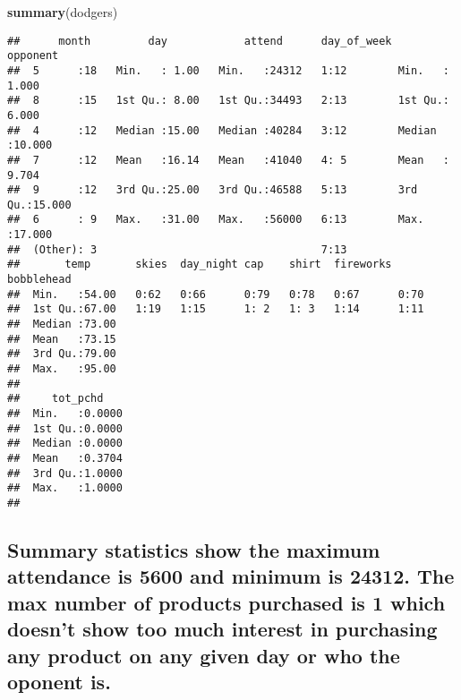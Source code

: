 \documentclass[
]{article}
\newenvironment{Shaded}{\begin{snugshade}}{\end{snugshade}}
\newcommand{\KeywordTok}[1]{\textcolor[rgb]{0.13,0.29,0.53}{\textbf{#1}}}
\newcommand{\NormalTok}[1]{#1}
\begin{document}
\begin{Shaded}
\begin{Highlighting}[]
\KeywordTok{summary}\NormalTok{(dodgers)}
\end{Highlighting}
\end{Shaded}

\begin{verbatim}
##      month         day            attend      day_of_week    opponent     
##  5      :18   Min.   : 1.00   Min.   :24312   1:12        Min.   : 1.000  
##  8      :15   1st Qu.: 8.00   1st Qu.:34493   2:13        1st Qu.: 6.000  
##  4      :12   Median :15.00   Median :40284   3:12        Median :10.000  
##  7      :12   Mean   :16.14   Mean   :41040   4: 5        Mean   : 9.704  
##  9      :12   3rd Qu.:25.00   3rd Qu.:46588   5:13        3rd Qu.:15.000  
##  6      : 9   Max.   :31.00   Max.   :56000   6:13        Max.   :17.000  
##  (Other): 3                                   7:13                        
##       temp       skies  day_night cap    shirt  fireworks bobblehead
##  Min.   :54.00   0:62   0:66      0:79   0:78   0:67      0:70      
##  1st Qu.:67.00   1:19   1:15      1: 2   1: 3   1:14      1:11      
##  Median :73.00                                                      
##  Mean   :73.15                                                      
##  3rd Qu.:79.00                                                      
##  Max.   :95.00                                                      
##                                                                     
##     tot_pchd     
##  Min.   :0.0000  
##  1st Qu.:0.0000  
##  Median :0.0000  
##  Mean   :0.3704  
##  3rd Qu.:1.0000  
##  Max.   :1.0000  
## 
\end{verbatim}

\hypertarget{summary-statistics-show-the-maximum-attendance-is-5600-and-minimum-is-24312.-the-max-number-of-products-purchased-is-1-which-doesnt-show-too-much-interest-in-purchasing-any-product-on-any-given-day-or-who-the-oponent-is.}{%
\subsection{Summary statistics show the maximum attendance is 5600 and
minimum is 24312. The max number of products purchased is 1 which
doesn't show too much interest in purchasing any product on any given
day or who the oponent
is.}\label{summary-statistics-show-the-maximum-attendance-is-5600-and-minimum-is-24312.-the-max-number-of-products-purchased-is-1-which-doesnt-show-too-much-interest-in-purchasing-any-product-on-any-given-day-or-who-the-oponent-is.}}
\end{document}
